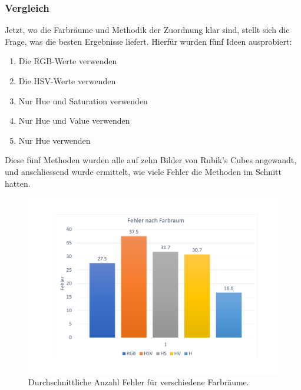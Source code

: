 \documentclass[a4paper, 12pt]{article}
\begin{document}
\subsubsection{Vergleich}
Jetzt, wo die Farbräume und Methodik der Zuordnung klar sind, stellt sich die Frage, was die besten Ergebnisse liefert. Hierfür wurden fünf Ideen ausprobiert:
\begin{enumerate}
  \item Die RGB-Werte verwenden
  \item Die HSV-Werte verwenden
  \item Nur Hue und Saturation verwenden
  \item Nur Hue und Value verwenden
  \item Nur Hue verwenden
\end{enumerate}
Diese fünf Methoden wurden alle auf zehn Bilder von Rubik's Cubes angewandt, und anschliessend wurde ermittelt, wie viele Fehler die Methoden im Schnitt hatten. 
\begin{figure}[H]
\includegraphics[scale=0.4]{Fehler_nach_Methode}
\caption{Durchschnittliche Anzahl Fehler für verschiedene Farbräume.}
\end{figure}
\end{document}
